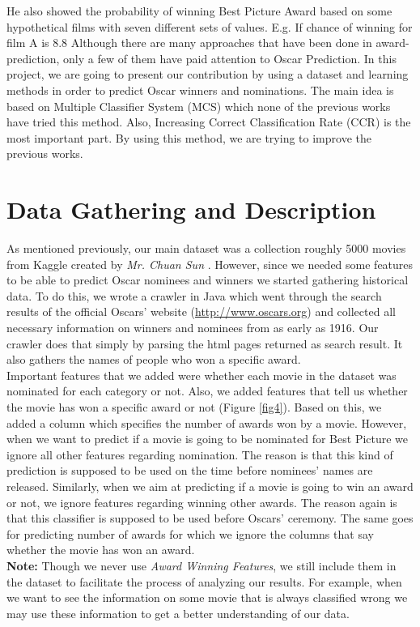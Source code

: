 \documentclass[journal,transmag]{IEEEtran}
\begin{document}
He also showed the probability of winning Best Picture Award based on some hypothetical films with seven different sets of values. E.g. If chance of winning for film A is 8.8%
Although there are many approaches that have been done in award-prediction, only a few of them have paid attention to Oscar Prediction. In this project, we are going to present our contribution by using a dataset and learning methods in order to predict Oscar winners and nominations. The main idea is based on Multiple Classifier System (MCS) which none of the previous works have tried this method. Also, Increasing Correct Classification Rate (CCR) is the most important part. By using this method, we are trying to improve the previous works.
	
	
	\section{Data Gathering and Description}
As mentioned previously, our main dataset was a collection roughly 5000 movies from Kaggle created by \emph{Mr. Chuan Sun} \cite{refCreator}. However, since we needed some features to be able to predict Oscar nominees and winners we started gathering historical data. To do this, we wrote a crawler in Java which went through the search results of the official Oscars' website (\url{http://www.oscars.org}) and collected all necessary information on winners and nominees from as early as 1916. Our crawler does that simply by parsing the html pages returned as search result. It also gathers the names of people who won a specific award.\\
Important features that we added were whether each movie in the dataset was nominated for each category or not. Also, we added features that tell us whether the movie has won a specific award or not (Figure \ref{fig4}). Based on this, we added a column which specifies the number of awards won by a movie. However, when we want to predict if a movie is going to be nominated for Best Picture we ignore all other features regarding nomination. The reason is that this kind of prediction is supposed to be used on the time before nominees' names are released. Similarly, when we aim at predicting if a movie is going to win an award or not, we ignore features regarding winning other awards. The reason again is that this classifier is supposed to be used before Oscars' ceremony. The same goes for predicting number of awards for which we ignore the columns that say whether the movie has won an award.\\
\textbf{Note:} Though we never use \emph{Award Winning Features}, we still include them in the dataset to facilitate the process of analyzing our results. For example, when we want to see the information on some movie that is always classified wrong we may use these information to get a better understanding of our data.\\
\end{document}
